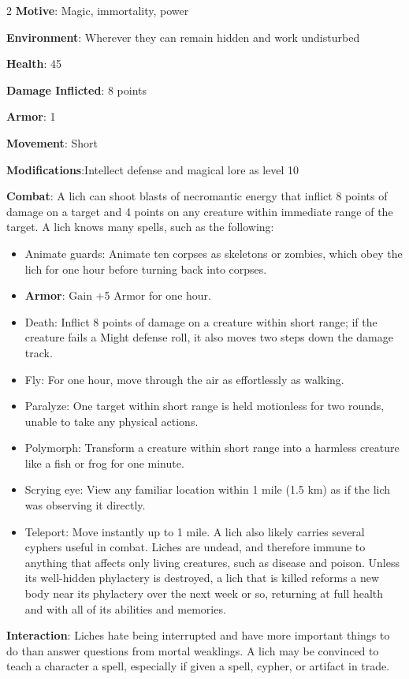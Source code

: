 \begin{multicols}{2}
\textbf{Motive}: Magic, immortality, power 

\textbf{Environment}: Wherever they can remain hidden and work undisturbed 

\textbf{Health}: 45 

\textbf{Damage Inflicted}: 8 points 

\textbf{Armor}: 1 

\textbf{Movement}: Short 

\textbf{Modifications}:Intellect defense and magical lore as level 10 

\textbf{Combat}: A lich can shoot blasts of necromantic energy that inflict 8 points of damage on a target and 4 points on any creature within immediate range of the target. A lich knows many spells, such as the following:

\begin{itemize}
\item Animate guards: Animate ten corpses as skeletons or zombies, which obey the lich for one hour before turning back into corpses.
\item \textbf{Armor}: Gain +5 Armor for one hour. 
\item Death: Inflict 8 points of damage on a creature within short range; if the creature fails a Might defense roll, it also moves two steps down the damage track. 
\item Fly: For one hour, move through the air as effortlessly as walking. 
\item Paralyze: One target within short range is held motionless for two rounds, unable to take any physical actions. 
\item Polymorph: Transform a creature within short range into a harmless creature like a fish or frog for one minute. 
\item Scrying eye: View any familiar location within 1 mile (1.5 km) as if the lich was observing it directly. 
\item
 Teleport: Move instantly up to 1 mile. A lich also likely carries several cyphers useful in combat. Liches are undead, and therefore immune to anything that affects only living creatures, such as disease and poison. Unless its well-hidden phylactery is destroyed, a lich that is killed reforms a new body near its phylactery over the next week or so, returning at full health and with all of its abilities and memories. 
\end{itemize}

\textbf{Interaction}: Liches hate being interrupted and have more important things to do than answer questions from mortal weaklings. A lich may be convinced to teach a character a spell, especially if given a spell, cypher, or artifact in trade. 


\end{multicols}
